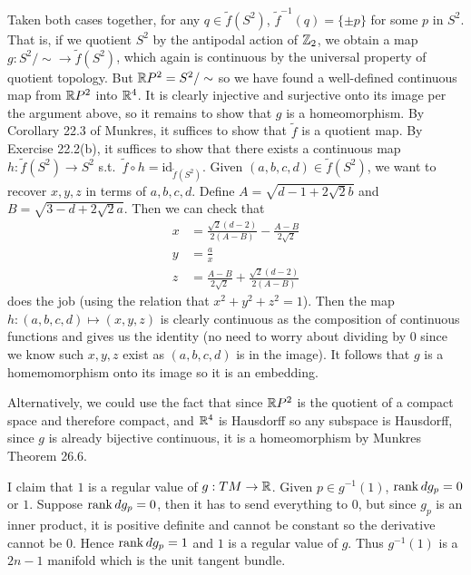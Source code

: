 \documentclass[12pt]{article}
\begin{document}
\begin{problem}[4]
	Taken both cases together, for any $ q \in \widetilde{ f}(S^2)$, $ \widetilde{ f}^{-1}(q) = \{ \pm p\}$ for some $ p$ in  $ S^2$. That is, if we quotient $ S^2$ by the antipodal action of $ \mathbb{Z}_2$, we obtain a map $ g: S^2 / \sim \to \widetilde{ f}(S^2)$, which again is continuous by the universal property of quotient topology. But $ \mathbb{R} P^2 = S^2 / \sim$ so we have found a well-defined continuous map from $ \mathbb{R} P^2$ into $ \mathbb{R}^{4}$. It is clearly injective and surjective onto its image per the argument above, so it remains to show that $ g$ is a homeomorphism. By Corollary 22.3 of Munkres, it suffices to show that $ \widetilde{ f}$ is a quotient map. By Exercise 22.2(b), it suffices to show that there exists a continuous map $ h:\widetilde{ f}(S^2) \to S^2$ s.t.\ $ \widetilde{ f} \circ h = \text{id}_{ \widetilde{ f}(S^2)} $.  Given $ (a,b,c,d) \in \widetilde{ f}(S^2)$, we want to recover $ x,y,z$ in terms of  $ a,b,c,d$. Define  $ A=\sqrt{d-1+2\sqrt{2} b} $ and $ B = \sqrt{3-d+2\sqrt{2}a } $. Then we can check that
	\begin{align*}
x &=\frac{\sqrt{2}(d-2) }{2(A-B) } - \frac{A-B}{ 2\sqrt{2} } \\
y &= \frac{a}{x} \\
		z &= \frac{A-B}{2\sqrt{2}  }+\frac{\sqrt{2}(d-2) }{2(A-B) }
	\end{align*}
	does the job (using the relation that $ x^2+y^2+z^2=1$). Then the map $ h:(a,b,c,d)\mapsto (x,y,z)$ is clearly continuous as the composition of continuous functions and gives us the identity (no need to worry about dividing by 0 since we know such $ x,y,z$ exist as $ (a,b,c,d)$ is in the image). It follows that $ g$ is a homemomorphism onto its image so it is an embedding.

	Alternatively, we could use the fact that since $ \mathbb{R} P^2$ is the quotient of a compact space and therefore compact, and $ \mathbb{R}^{4}$ is Hausdorff so any subspace is Hausdorff, since $ g$ is already bijective continuous, it is a homeomorphism by Munkres Theorem 26.6.

\end{problem}
\begin{problem}[7.16]
I claim that $ 1$ is a regular value of  $ g:TM \to \mathbb{R}$. Given $ p \in g^{-1}(1)$, $ \operatorname{rank} dg_p = 0$ or $1 $. Suppose $ \operatorname{rank} dg_p = 0$, then it has to send everything to 0, but since $ g_p$ is an inner product, it is positive definite and cannot be constant so the derivative cannot be 0. Hence $ \operatorname{rank} dg_p =1$ and $ 1$ is a regular value of  $ g$. Thus  $ g^{-1}(1)$ is a $ 2n-1$ manifold which is the unit tangent bundle.
\end{problem}
\end{document}
